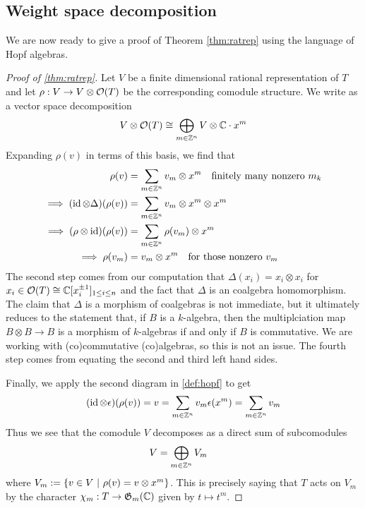 \documentclass{amsart}
\numberwithin{equation}{section}
\theoremstyle{plain} %
\theoremstyle{definition}
\theoremstyle{remark}
\begin{document}
\subsection{Weight space decomposition}
We are now ready to give a proof of Theorem \ref{thm:ratrep} using the language of Hopf algebras.
\begin{proof}
    [Proof of \ref{thm:ratrep}] Let $V$ be a finite dimensional rational representation of $T$ 
    and let $\rho: V\to V\otimes \mathcal{O}(T)$ be the corresponding comodule structure. We write as a vector space 
    decomposition \begin{align*}
        V \otimes \mathcal{O}(T) \cong \bigoplus_{m\in\mathbb{Z}^n} V\otimes \mathbb{C}\cdot x^m
    \end{align*} Expanding $\rho(v)$ in terms of this basis, we find that \begin{align*}
        \rho(v) &= \sum_{m\in\mathbb{Z}^n} v_m\otimes x^m \text{\quad finitely many nonzero $m_k$} \\
        \implies (\operatorname{id} \otimes \Delta)(\rho(v)) &= \sum_{m\in\mathbb{Z}^n} v_m\otimes x^m\otimes x^m \\
        \implies (\rho\otimes \operatorname{id})(\rho(v)) &= \sum_{m\in\mathbb{Z}^n} \rho(v_m)\otimes x^m \\
        \implies \rho(v_m) &= v_m\otimes x^m \text{\quad for those nonzero $v_m$}
    \end{align*} The second step comes from our computation that $\Delta(x_i) = x_i\otimes x_i$ for $x_i\in {\mathcal{O}}(T) \cong \mathbb{C}[x_i^{\pm 1}]_{1\leq i \leq n}$
    and the fact that $\Delta$ is an coalgebra homomorphism. The claim that $\Delta$ is a 
    morphism of coalgebras is not immediate, but it ultimately reduces to the statement that, if $B$ is
    a $k$-algebra, then the multiplciation map $B\otimes B\to B$ is a morphism of $k$-algebras if and only if $B$ is commutative.
    We are working with (co)commutative (co)algebras, so this is not an issue. The fourth step comes from equating the second and third left hand sides.

    \hfill 

    Finally, we apply the second diagram in \ref{def:hopf} to get \begin{align*}
        (\operatorname{id}\otimes \epsilon)(\rho(v)) = v = \sum_{m\in\mathbb{Z}^n} v_m\epsilon(x^m) = \sum_{m\in\mathbb{Z}^n} v_m
    \end{align*} Thus we see that the comodule $V$ decomposes as a direct sum of subcomodules \begin{align*}
        V &= \bigoplus_{m\in\mathbb{Z}^n} V_m
    \end{align*} where $V_m := \{v\in V \ \vert \  \rho(v) = v\otimes x^m\}$. This is precisely saying that $T$ acts on $V_m$ by the character $\chi_m: T\to \mathfrak{G}_m(\mathbb{C})$ given by $t\mapsto t^m$.
\end{proof}
\end{document}

